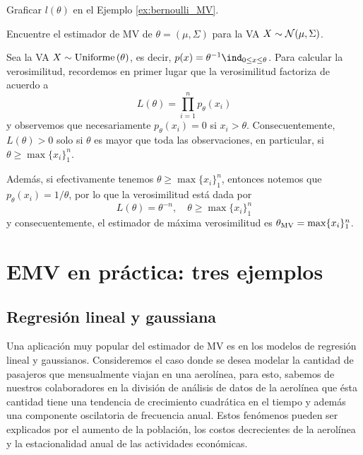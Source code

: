 \begin{exercise}
	Graficar $l(\theta)$ en el Ejemplo \ref{ex:bernoulli_MV}.
\end{exercise}

\begin{exercise}
	Encuentre el estimador de MV de $\theta = (\mu,\Sigma)$ para la VA $X\sim{\mathcal N}(\mu,\Sigma)$.
\end{exercise}

\begin{example}
	Sea la VA $X\sim\text{Uniforme}\left(\theta\right)$, es decir, $p(x) = \theta^{-1} \ind_{0\leq x \leq \theta}$. Para calcular la verosimilitud, recordemos en primer lugar que la verosimilitud factoriza de acuerdo a  
	\begin{equation}
		L(\theta) = \prod_{i=1}^n p_\theta(x_i)
	\end{equation}
	y observemos que necesariamente $p_\theta(x_i) = 0$ si $x_i>\theta$. Consecuentemente, $L(\theta)>0$ solo si $\theta$ es mayor que toda las observaciones, en particular, si $\theta\geq\max\{x_i\}_1^n$.

	Además, si efectivamente tenemos $\theta\geq\max\{x_i\}_1^n$, entonces notemos que $p_\theta(x_i) = 1/\theta$, por lo que la verosimilitud está dada por
		\begin{equation}
		L(\theta) = \theta^{-n}, \quad \theta\geq\max\{x_i\}_1^n
	\end{equation}
	y consecuentemente, el estimador de máxima verosimilitud es ${\theta_\text{MV}} = \max\{x_i\}_1^n$.
\end{example}

\section{EMV en práctica: tres ejemplos} %
\label{sub:MV_tres_ejemplos}

\subsection{Regresión lineal y gaussiana} 
\label{sub:reg_lin}


Una aplicación muy popular del estimador de MV es en los modelos de regresión lineal y gaussianos. Consideremos el caso donde se desea modelar la cantidad de pasajeros que mensualmente viajan en una aerolínea, para esto, sabemos de nuestros colaboradores en la división de análisis de datos de la aerolínea que ésta cantidad tiene una tendencia de crecimiento cuadrática en el tiempo y además una componente oscilatoria de frecuencia anual. Estos fenómenos pueden ser explicados por el aumento de la población, los costos decrecientes de la aerolínea y la estacionalidad anual de las actividades económicas. 

